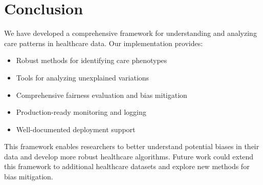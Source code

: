 \documentclass[12pt]{article}
\begin{document}
\section{Conclusion}

We have developed a comprehensive framework for understanding and analyzing care patterns in healthcare data. Our implementation provides:

\begin{itemize}
    \item Robust methods for identifying care phenotypes
    \item Tools for analyzing unexplained variations
    \item Comprehensive fairness evaluation and bias mitigation
    \item Production-ready monitoring and logging
    \item Well-documented deployment support
\end{itemize}

This framework enables researchers to better understand potential biases in their data and develop more robust healthcare algorithms. Future work could extend this framework to additional healthcare datasets and explore new methods for bias mitigation.



\end{document}
